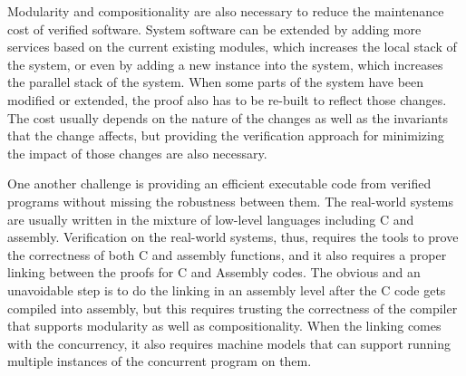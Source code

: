 Modularity and compositionality are also necessary to reduce the maintenance cost of verified software.
System software can be extended by adding more services based on the current existing modules, which increases the local stack of the system, or even by adding a new instance into the system, which increases the parallel stack of the system.
When some parts of the system have been modified or extended, the proof also has to be re-built to reflect those changes. 
The cost usually depends on the nature of the changes as well as the invariants that the change affects,
but providing the verification approach for minimizing the impact of those changes are also necessary. 

%

One another challenge is providing an efficient executable code from verified programs without missing the robustness between them. 
The real-world systems are usually written in the mixture of low-level languages including C and assembly.
Verification on the real-world systems, thus, requires the tools to prove the correctness of both C and assembly functions, and 
it also requires a proper linking between the proofs for C and Assembly codes.
The obvious and an unavoidable step is to
do the linking in an assembly level after the C code gets compiled into assembly,
but this requires trusting the correctness of the compiler that supports modularity as well as compositionality.
When the linking comes with the concurrency, 
it also requires machine models that can support running multiple instances of the concurrent program on them. 

